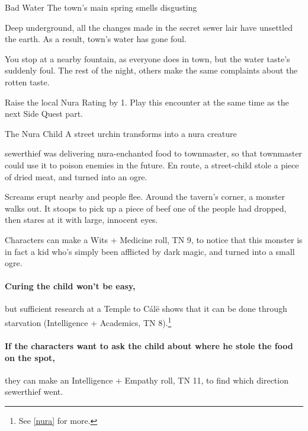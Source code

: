 \begin{multicols}{2}
{\squash\N Bad Water}%
{The town's main spring smells disgusting}%

Deep underground, all the changes made in the secret sewer lair have unsettled the earth.
As a result, \gls{town}'s water has gone foul.

\begin{boxtext}

  You stop at a nearby fountain, as everyone does in \gls{town}, but the water taste's suddenly foul.
  The rest of the night, others make the same complaints about the rotten taste.

\end{boxtext}

Raise the local Nura Rating by 1.
Play this encounter at the same time as the next Side Quest part.

{\N The Nura Child}%
{A street urchin transforms into a nura creature}%

\Gls{sewerthief} was delivering nura-enchanted food to \gls{townmaster}, so that \gls{townmaster} could use it to poison enemies in the future.
En route, a street-child stole a piece of dried meat, and turned into an ogre.

\begin{boxtext}

  Screams erupt nearby and people flee.
  Around the tavern's corner, a monster walks out.
  It stoops to pick up a piece of beef one of the people had dropped, then stares at it with large, innocent eyes.

\end{boxtext}

Characters can make a Wits + Medicine roll, TN 9, to notice that this monster is in fact a kid who's simply been afflicted by dark magic, and turned into a small ogre.

\paragraph{Curing the child won't be easy,}
but sufficient research at a Temple to C\'{a}l\"{e} shows that it can be done through starvation (Intelligence + Academics, TN 8).\footnote{See \autoref{nura} for more.}

\paragraph{If the characters want to ask the child about where he stole the food on the spot,}
they can make an Intelligence + Empathy roll, TN 11, to find which direction \gls{sewerthief} went.


\end{multicols}
